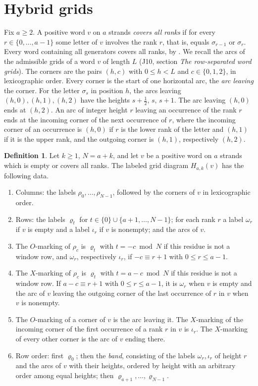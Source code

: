 \documentclass[11pt]{amsart}
\theoremstyle{definition}
\newtheorem{definition}[theorem]{Definition}
\theoremstyle{remark}
\newcommand{\lean}[1]{\texttt{\seqsplit{#1}}}
\begin{document}
\section{Hybrid grids}\label{sec:hybrid}

Fix $a\ge2$. A positive word $v$ on $a$ strands \emph{covers all ranks} if for every
$r\in\{0,\dots,a-1\}$ some letter of $v$ involves the rank $r$, that is, equals $\sigma_{r-1}$ or
$\sigma_r$. Every word containing all generators covers all ranks, by
\lean{positiveRectilinearWord\_all\_rows\_occur}. We recall the arcs of the admissible grids of a word
$v$ of length $L$ (J10, section \emph{The row-separated word grids}). The corners are the pairs
$(h,c)$ with $0\le h<L$ and $c\in\{0,1,2\}$, in lexicographic order. Every corner is the start of
one horizontal arc, the \emph{arc leaving} the corner. For the letter $\sigma_s$ in position $h$,
the arcs leaving $(h,0),(h,1),(h,2)$ have the heights $s+\frac12$, $s$, $s+1$. The arc leaving
$(h,0)$ ends at $(h,2)$. An arc of integer height $r$ leaving an occurrence of the rank $r$ ends at
the incoming corner of the next occurrence of $r$, where the incoming corner of an occurrence is
$(h,0)$ if $r$ is the lower rank of the letter and $(h,1)$ if it is the upper rank, and the
outgoing corner is $(h,1)$, respectively $(h,2)$.

\begin{definition}\label{def:hybrid}
Let $k\ge1$, $N=a+k$, and let $v$ be a positive word on $a$ strands which is empty or covers all
ranks. The labeled grid diagram $H_{a,k}(v)$ has the following data.
\begin{enumerate}
\item Columns: the labels $\rho_0,\dots,\rho_{N-1}$, followed by the corners of $v$ in
lexicographic order.
\item Rows: the labels $\varrho_t$ for $t\in\{0\}\cup\{a+1,\dots,N-1\}$; for each rank $r$ a label
$\omega_r$ if $v$ is empty and a label $\iota_r$ if $v$ is nonempty; and the arcs of $v$.
\item The $O$-marking of $\rho_c$ is $\varrho_t$ with $t=-c\bmod N$ if this residue is not a window
row, and $\omega_r$, respectively $\iota_r$, if $-c\equiv r+1$ with $0\le r\le a-1$.
\item The $X$-marking of $\rho_c$ is $\varrho_t$ with $t=a-c\bmod N$ if this residue is not a window
row. If $a-c\equiv r+1$ with $0\le r\le a-1$, it is $\omega_r$ when $v$ is empty and the arc of $v$
leaving the outgoing corner of the last occurrence of $r$ in $v$ when $v$ is nonempty.
\item The $O$-marking of a corner of $v$ is the arc leaving it. The $X$-marking of the incoming
corner of the first occurrence of a rank $r$ in $v$ is $\iota_r$. The $X$-marking of every other
corner is the arc of $v$ ending there.
\item Row order: first $\varrho_0$; then the \emph{band}, consisting of the labels
$\omega_r,\iota_r$ of height $r$ and the arcs of $v$ with their heights, ordered by height with an
arbitrary order among equal heights; then $\varrho_{a+1},\dots,\varrho_{N-1}$.
\end{enumerate}
\end{definition}
\end{document}
